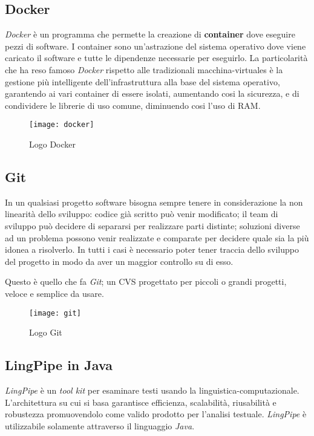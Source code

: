 \subsection{Docker}
\textit{Docker} è un programma che permette la creazione di \textbf{container}
dove eseguire pezzi di software. I container sono un'astrazione del sistema
operativo dove viene caricato il software e tutte le dipendenze necessarie per
eseguirlo. La particolarità che ha reso famoso \textit{Docker} rispetto alle
tradizionali \glspl{macchina-virtuale} è la gestione più intelligente
dell'infrastruttura alla base del sistema operativo, garantendo ai vari
container di essere isolati, aumentando cosi la sicurezza, e di condividere le
librerie di uso comune, diminuendo cosi l'uso di \acrshort{RAM}.
\begin{figure}[H]
\begin{center}
\texttt{[image: docker]}
\caption{Logo Docker}
\label{fig:docker_logo}
\end{center}
\end{figure}

\subsection{Git}
In un qualsiasi progetto software bisogna sempre tenere in considerazione la non
linearità dello sviluppo: codice già scritto può venir modificato; il team di
sviluppo può decidere di separarsi per realizzare parti distinte; soluzioni
diverse ad un problema possono venir realizzate e comparate per decidere quale
sia la più idonea a risolverlo. In tutti i casi è necessario poter tener traccia
dello sviluppo del progetto in modo da aver un maggior controllo su di esso.

Questo è quello che fa \textit{Git}; un \gls{CVS} progettato per piccoli o
grandi progetti, veloce e semplice da usare.

\begin{figure}[H]
\begin{center}
\texttt{[image: git]}
\caption{Logo Git}
\label{fig:git_logo}
\end{center}
\end{figure}

\subsection{LingPipe in Java}
\textit{LingPipe} è un \textit{tool kit} per esaminare testi usando la
\gls{linguistica-computazionale}. L'architettura su cui si basa garantisce
efficienza, scalabilità, riusabilità e robustezza promuovendolo come valido
prodotto per l'analisi testuale. \textit{LingPipe} è utilizzabile solamente
attraverso il linguaggio \textit{Java}.

